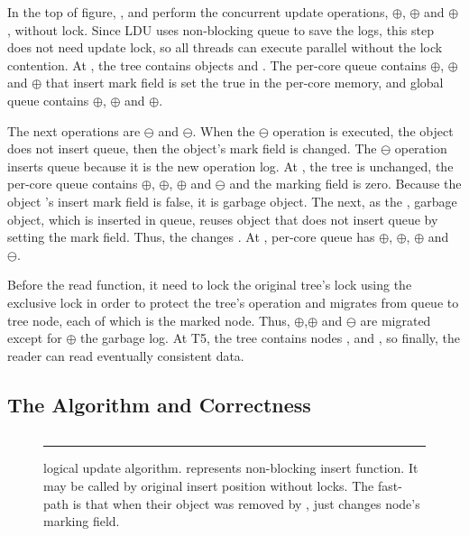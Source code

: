 In the top of figure, ,  and  perform the
concurrent update operations, $\oplus$, $\oplus$ and
$\oplus$, without lock.
Since LDU uses non-blocking queue to save the logs, this step does not need
update lock, so all threads can execute parallel without the lock contention.
At , the tree contains objects  and . 
The per-core queue contains $\oplus$, $\oplus$ and
$\oplus$ that insert mark field is set the true in the per-core
memory, and global queue contains $\oplus$, $\oplus$ and
$\oplus$.

The next operations are $\ominus$ and $\ominus$.
When the $\ominus$ operation is executed, the object does not insert
queue, then the object's mark field is changed. 
The $\ominus$ operation inserts queue because it is the new operation
log.
At , the tree is unchanged, the per-core queue
contains $\oplus$, $\oplus$, $\oplus$ and
$\ominus$ and the marking field is zero.
Because the object 's insert mark field is false, it is garbage
object.
The next, as the , garbage object, which is inserted in queue, reuses
object that does not insert queue by setting the mark field.
Thus, the  changes .
At , per-core queue has $\oplus$, $\oplus$,
$\oplus$ and $\ominus$.

Before the read function, it need to lock the original tree's lock using the
exclusive lock in order to protect the tree's operation and migrates from queue
to tree node, each of which is the marked node.
Thus, $\oplus$,$\oplus$ and $\ominus$ are
migrated except for $\oplus$ the garbage log.
At T5, the tree contains nodes  ,  and
, so finally, the reader can read eventually consistent data.


\subsection{The Algorithm and Correctness}

\begin{figure}[tb]
\begin{center}
\inputminted[linenos,fontsize=\footnotesize, tabsize=2]{c}{src/ldu_logical.c}
\end{center}
\rule{\columnwidth}{0.5pt}
\vspace{-\baselineskip}
\caption{ logical update algorithm.  represents
 non-blocking insert function.
It may be called by original insert position without locks. The fast-path is
 that when their object was removed by ,
  just changes node's marking field.}
\label{fig:gldulogicalupdate}
\end{figure}


